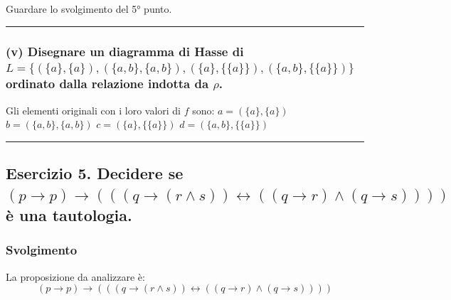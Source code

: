 Guardare lo svolgimento del 5° punto.

\vspace{0.3cm}
\hrule
\vspace{0.3cm}

\subsubsection*{(v) Disegnare un diagramma di Hasse di $L = \{(\{a\}, \{a\}), (\{a, b\}, \{a, b\}), (\{a\}, \{\{a\}\}), (\{a, b\}, \{\{a\}\})\}$ ordinato dalla relazione indotta da $\rho$.}

Gli elementi originali con i loro valori di $f$ sono:
$a = (\{a\}, \{a\})$
$b = (\{a, b\}, \{a, b\})$
$c = (\{a\}, \{\{a\}\})$
$d = (\{a, b\}, \{\{a\}\})$

\begin{figure}[h]
    \centering
\end{figure}

\vspace{0.5cm}
\hrule
\vspace{0.5cm}

\subsection*{Esercizio 5. Decidere se $(p \to p) \to (((q \to (r \wedge s)) \leftrightarrow ((q \to r) \wedge (q \to s))))$ è una tautologia.}

\subsubsection*{Svolgimento}

La proposizione da analizzare è:
$$ (p \to p) \to (((q \to (r \wedge s)) \leftrightarrow ((q \to r) \wedge (q \to s)))) $$

